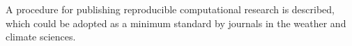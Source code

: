 A procedure for publishing reproducible computational research is described, which could be adopted as a minimum standard by journals in the weather and climate sciences.  
  